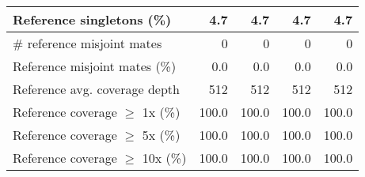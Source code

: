 \documentclass[12pt,a4paper]{article}
\begin{document}
\begin{table}[ht]
\begin{center}
\begin{tabular}{|l*{4}{|r}|}
Reference singletons (\%) & 4.7 & 4.7 & 4.7 & 4.7 \\ \hline
\# reference misjoint mates & 0 & 0 & 0 & 0 \\ \hline
Reference misjoint mates (\%) & 0.0 & 0.0 & 0.0 & 0.0 \\ \hline
Reference avg. coverage depth & 512 & 512 & 512 & 512 \\ \hline
Reference coverage $\geq$ 1x (\%) & 100.0 & 100.0 & 100.0 & 100.0 \\ \hline
Reference coverage $\geq$ 5x (\%) & 100.0 & 100.0 & 100.0 & 100.0 \\ \hline
Reference coverage $\geq$ 10x (\%) & 100.0 & 100.0 & 100.0 & 100.0 \\ \hline
\end{tabular}
\end{center}
\end{table}
\end{document}
